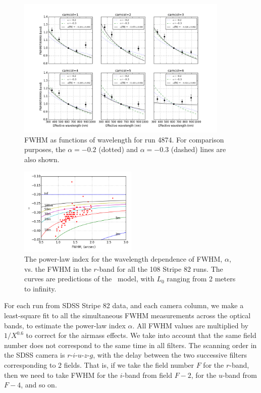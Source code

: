 \begin{figure}
\centering
\includegraphics[width=0.9\textwidth]{FIGURES/fwhm_lambda.png}
\caption{FWHM as functions of wavelength for run 4874.
For comparison purposes, the $\alpha=-0.2$ (dotted) and $\alpha=-0.3$ (dashed) lines are
also shown.
\label{fig:fwhm_lambda}}
\end{figure}


\begin{figure}
\centering
\includegraphics[width=0.5\textwidth]{FIGURES/alpha_fwhm.png}
\caption{The power-law index for the wavelength dependence of FWHM, $\alpha$, 
vs. the FWHM in the $r$-band for all the 108 Stripe 82 runs. 
The curves are predictions of the \vk~model, with $L_0$ ranging from 2 meters to infinity.
\label{fig:alpha_fwhm}}
\end{figure}

 
For each run from SDSS Stripe 82 data, and each camera column, we make
a least-square fit to
all the simultaneous FWHM measurements across the optical bands, to
estimate the power-law index $\alpha$.
All FWHM values are multiplied by $1/X^{0.6}$ to correct for the airmass effects.
We take into account that the same field number does not correspond to the same
time in all filters. The scanning order in the SDSS camera is $r$-$i$-$u$-$z$-$g$, with the delay between the two 
successive filters corresponding to 2 fields. That is, if we take the field number $F$ for the $r$-band, then
we need to take FWHM for the $i$-band from field $F-2$, for the $u$-band
from $F-4$, and so on. 

